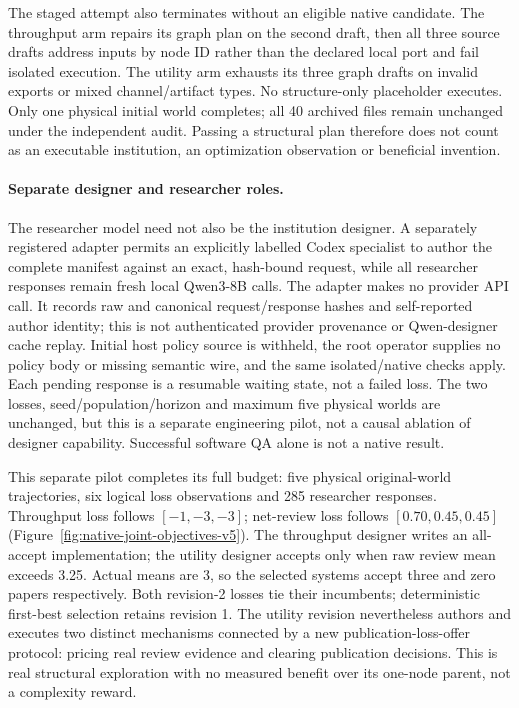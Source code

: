The staged attempt also terminates without an eligible native candidate. The
throughput arm repairs its graph plan on the second draft, then all three source
drafts address inputs by node ID rather than the declared local port and fail
isolated execution. The utility arm exhausts its three graph drafts on invalid
exports or mixed channel/artifact types. No structure-only placeholder executes.
Only one physical initial world completes; all 40 archived files remain unchanged
under the independent audit. Passing a structural plan therefore does not count
as an executable institution, an optimization observation or beneficial invention.

\paragraph{Separate designer and researcher roles.}
The researcher model need not also be the institution designer. A separately
registered adapter permits an explicitly labelled Codex specialist to author
the complete manifest against an exact, hash-bound request, while all researcher
responses remain fresh local Qwen3-8B calls. The adapter makes no provider API
call. It records raw and canonical request/response hashes and self-reported
author identity; this is not authenticated provider provenance or Qwen-designer
cache replay. Initial host policy source is withheld, the root operator supplies
no policy body or missing semantic wire, and the same isolated/native checks
apply. Each pending response is a resumable waiting state, not a failed loss.
The two losses, seed/population/horizon and maximum five physical worlds are
unchanged, but this is a separate engineering pilot, not a causal ablation of
designer capability. Successful software QA alone is not a native result.

This separate pilot completes its full budget: five physical original-world
trajectories, six logical loss observations and 285 researcher responses.
Throughput loss follows $[-1,-3,-3]$; net-review loss follows
$[0.70,0.45,0.45]$ (Figure~\ref{fig:native-joint-objectives-v5}). The throughput
designer writes an all-accept implementation; the utility designer accepts
only when raw review mean exceeds 3.25. Actual means are 3, so the selected
systems accept three and zero papers respectively. Both revision-2 losses tie
their incumbents; deterministic first-best selection retains revision 1.
The utility revision nevertheless authors and executes two distinct mechanisms
connected by a new publication-loss-offer protocol: pricing real review evidence
and clearing publication decisions. This is real structural exploration with
no measured benefit over its one-node parent, not a complexity reward.

